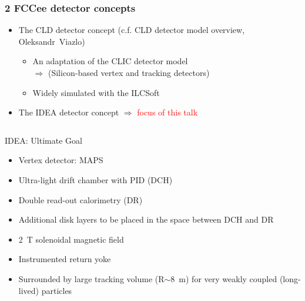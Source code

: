 \documentclass[aspectratio=169, hyperref={colorlinks=true,pdfpagelabels=false,linkcolor=black}, xcolor=dvipsnames,10pt]{beamer}
\begin{document}
\begin{frame}
	\frametitle{2 FCCee detector concepts}
	
		\begin{itemize}
		\item The CLD detector concept (c.f. CLD detector model overview, Oleksandr~Viazlo)
			\begin{itemize}
			\item An adaptation of the CLIC detector model 
			\\ $\Rightarrow$ (Silicon-based vertex and tracking detectors)
			\item Widely simulated with the ILCSoft
			\end{itemize}
		\item The IDEA detector concept $\Rightarrow$ \textcolor{Red}{focus of this talk}
		\end{itemize}

	
	\vspace{-1.5cm}
	\begin{columns}
	
	\begin{block}{IDEA: Ultimate Goal}
	\begin{itemize}
	\item Vertex detector: MAPS
	\item Ultra-light drift chamber with PID (DCH)
	\item Double read-out calorimetry (DR)
        \item Additional disk layers to be placed in the space between DCH and DR 
	\item 2~T solenoidal magnetic field
	\item Instrumented return yoke
	\item Surrounded by large tracking volume (R$\sim$8~m) for very weakly coupled (long-lived) particles
	\end{itemize}
	\end{block}
	

\end{columns}
\end{frame}
\end{document}
